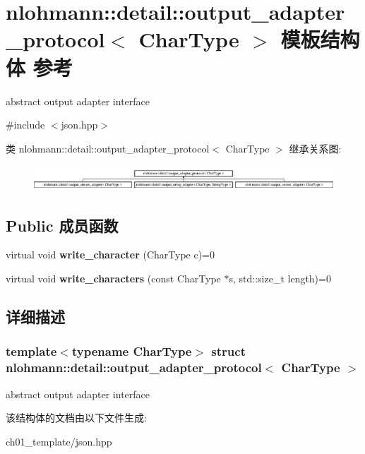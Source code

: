 \hypertarget{structnlohmann_1_1detail_1_1output__adapter__protocol}{}\section{nlohmann\+::detail\+::output\+\_\+adapter\+\_\+protocol$<$ Char\+Type $>$ 模板结构体 参考}
\label{structnlohmann_1_1detail_1_1output__adapter__protocol}


abstract output adapter interface  




{\ttfamily \#include $<$json.\+hpp$>$}

类 nlohmann\+::detail\+::output\+\_\+adapter\+\_\+protocol$<$ Char\+Type $>$ 继承关系图\+:\begin{figure}[H]
\begin{center}
\leavevmode
\includegraphics[height=0.962199cm]{structnlohmann_1_1detail_1_1output__adapter__protocol}
\end{center}
\end{figure}
\subsection*{Public 成员函数}
\begin{DoxyCompactItemize}
\item 
\mbox{\label{structnlohmann_1_1detail_1_1output__adapter__protocol_a3381896fe1be557f591de2e917cdc7d5}} 
virtual void {\bfseries write\+\_\+character} (Char\+Type c)=0
\item 
\mbox{\label{structnlohmann_1_1detail_1_1output__adapter__protocol_a2f410a164e0eda17cf6561114b0eee4a}} 
virtual void {\bfseries write\+\_\+characters} (const Char\+Type $\ast$s, std\+::size\+\_\+t length)=0
\end{DoxyCompactItemize}


\subsection{详细描述}
\subsubsection*{template$<$typename Char\+Type$>$\newline
struct nlohmann\+::detail\+::output\+\_\+adapter\+\_\+protocol$<$ Char\+Type $>$}

abstract output adapter interface 

该结构体的文档由以下文件生成\+:\begin{DoxyCompactItemize}
\item 
ch01\+\_\+template/json.\+hpp\end{DoxyCompactItemize}
